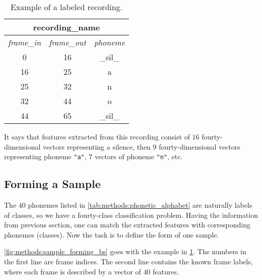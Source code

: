 \begin{table}[H]
\centering
\begin{tabular}{|c|c|c|}
\hline
\multicolumn{3}{|c|}{recording\_name}                                                                                     \\ \hline
\multicolumn{1}{|l|}{\textit{frame\_in}} & \multicolumn{1}{l|}{\textit{frame\_out}} & \multicolumn{1}{l|}{\textit{phoneme}} \\ \hline
0                                       & 16                                      & \_sil\_                               \\ \hline
16                                      & 25                                      & a                                     \\ \hline
25                                      & 32                                      & n                                     \\ \hline
32                                      & 44                                      & o                                     \\ \hline
44                                      & 65                                      & \_sil\_                               \\ \hline
\end{tabular}
\caption{Example of a labeled recording.}
\label{tab:methods:labeling_example}
\end{table}

It says that features extracted from this recording consist of $ 16 $ fourty-dimensional vectors representing a silence, then $ 9 $ fourty-dimensional vectors representing phoneme \texttt{"a"}, $ 7 $ vectors of phoneme \texttt{"n"}, etc.

\subsection*{Forming a Sample}
The $ 40 $ phonemes listed in \cref{tab:methods:phonetic_alphabet} are naturally labels of classes, so we have a fourty-class classification problem. Having the information from previous section, one can match the extracted features with corresponding phonemes (classes). Now the task is to define the form of one sample.

\cref{fig:methods:sample_forming_bs} goes with the example in \cref{tab:methods:labeling_example}. The numbers in the first line are frame indices. The second line contains the known frame labels, where each frame is described by a vector of $ 40 $ features.

